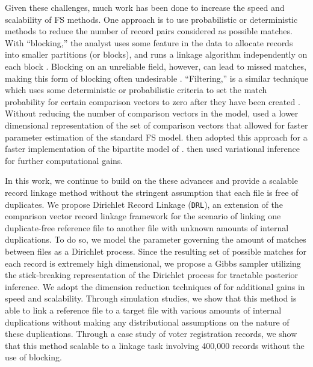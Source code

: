 \documentclass[12pt,letterpaper]{article}
\newcommand{\1}[1]{\mathbb{I}\!\left[#1\right]} %
\begin{document}
Given these challenges, much work has been done to increase the speed and scalability of FS methods. One approach is to use probabilistic or deterministic methods to reduce the number of record pairs considered as possible matches. With ``blocking,'' the analyst uses some feature in the data to allocate records into smaller partitions (or blocks), and runs a linkage algorithm independently on each block \citep{christen_data_2012}. Blocking on an unreliable field, however, can lead to missed matches, making this form of blocking often undesirable \citep{steorts_comparison_2014}. ``Filtering,'' is a similar technique which uses some deterministic or probabilistic criteria to set the match probability for certain comparison vectors to zero after they have been created \citep{murray2016probabilistic, mcveigh2019scaling}. Without reducing the number of comparison vectors in the model, \cite{enamorado_using_2019} used a lower dimensional representation of the set of comparison vectors that allowed for faster parameter estimation of the standard FS model. \cite{kundinger_2023} then adopted this approach for a faster implementation of the bipartite model of \cite{sadinle_bayesian_2017}. \cite{kundinger_2024_vabl} then used variational inference for further computational gains.
 
In this work, we continue to build on the these advances and provide a scalable record linkage method without the stringent assumption that each file is free of duplicates. We propose Dirichlet Record Linkage (\texttt{DRL}), an extension of the comparison vector record linkage framework for the scenario of linking one duplicate-free reference file to another file with unknown amounts of internal duplications. To do so, we model the parameter governing the amount of matches between files as a Dirichlet process. Since the resulting set of possible matches for each record is extremely high dimensional, we propose a Gibbs sampler utilizing the stick-breaking representation of the Dirichlet process for tractable posterior inference. We adopt the dimension reduction techniques of \cite{kundinger_2023} for additional gains in speed and scalability. Through simulation studies, we show that this method is able to link a reference file to a target file with various amounts of internal duplications without making any distributional assumptions on the nature of these duplications. Through a case study of voter registration records, we show that this method scalable to a linkage task involving 400,000 records without the use of blocking. 
\end{document}
